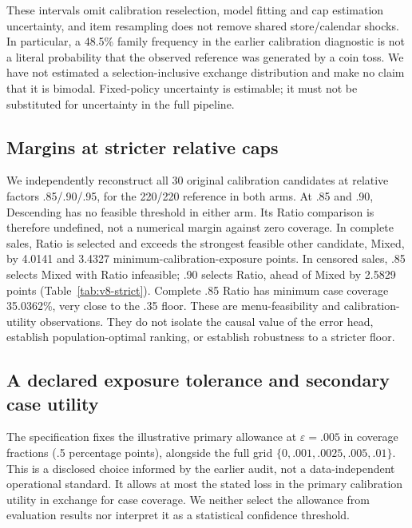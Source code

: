 These intervals omit calibration reselection, model fitting and cap estimation uncertainty, and item resampling does not remove shared store/calendar shocks. In particular, a 48.5\% family frequency in the earlier calibration diagnostic is not a literal probability that the observed reference was generated by a coin toss. We have not estimated a selection-inclusive exchange distribution and make no claim that it is bimodal. Fixed-policy uncertainty is estimable; it must not be substituted for uncertainty in the full pipeline.

\subsection{Margins at stricter relative caps}
\label{app:v8-strict}
We independently reconstruct all 30 original calibration candidates at relative factors .85/.90/.95, for the 220/220 reference in both arms. At .85 and .90, Descending has no feasible threshold in either arm. Its Ratio comparison is therefore undefined, not a numerical margin against zero coverage. In complete sales, Ratio is selected and exceeds the strongest feasible other candidate, Mixed, by 4.0141 and 3.4327 minimum-calibration-exposure points. In censored sales, .85 selects Mixed with Ratio infeasible; .90 selects Ratio, ahead of Mixed by 2.5829 points (Table~\ref{tab:v8-strict}). Complete .85 Ratio has minimum case coverage 35.0362\%, very close to the .35 floor. These are menu-feasibility and calibration-utility observations. They do not isolate the causal value of the error head, establish population-optimal ranking, or establish robustness to a stricter floor.


\FloatBarrier
\subsection{A declared exposure tolerance and secondary case utility}
\label{app:v8-tolerance}
The specification fixes the illustrative primary allowance at $\varepsilon=.005$ in coverage fractions (.5 percentage points), alongside the full grid $\{0,.001,.0025,.005,.01\}$. This is a disclosed choice informed by the earlier audit, not a data-independent operational standard. It allows at most the stated loss in the primary calibration utility in exchange for case coverage. We neither select the allowance from evaluation results nor interpret it as a statistical confidence threshold.


